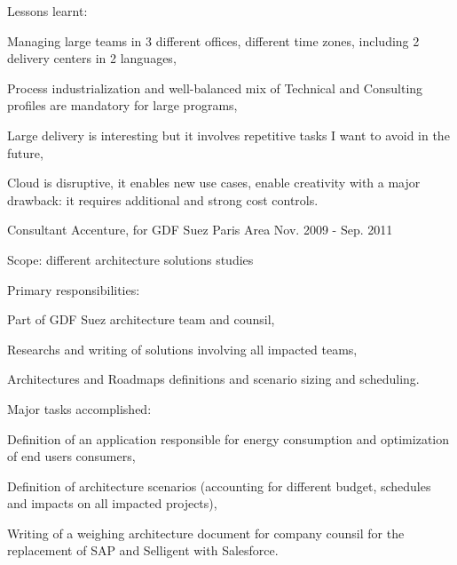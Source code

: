 \begin{cventries}
{\begin{cvitems}
\begin{cvsubitems}
        \end{cvsubitems}
        \item {Lessons learnt:}
        \begin{cvsubitems}
          \item {Managing large teams in 3 different offices, different time zones, including 2 delivery centers in 2 languages,}
          \item {Process industrialization and well-balanced mix of Technical and Consulting profiles are mandatory for large programs,}
          \item {Large delivery is interesting but it involves repetitive tasks I want to avoid in the future,}
          \item {Cloud is disruptive, it enables new use cases, enable creativity with a major drawback: it requires additional and strong cost controls.}
        \end{cvsubitems}
      \end{cvitems}
    }

  \cventry
    {Consultant} %
    {Accenture, for GDF Suez} %
    {Paris Area} %
    {Nov. 2009 - Sep. 2011} %
    {
      \begin{cvitems} %
        \item {Scope: different architecture solutions studies}
        \item {Primary responsibilities:}
        \begin{cvsubitems}
          \item {Part of GDF Suez architecture team and counsil,}
          \item {Researchs and writing of solutions involving all impacted teams,}
          \item {Architectures and Roadmaps definitions and scenario sizing and scheduling.}
        \end{cvsubitems}
        \item {Major tasks accomplished:}
        \begin{cvsubitems}
          \item {Definition of an application responsible for energy consumption and optimization of end users consumers,}
          \item {Definition of architecture scenarios (accounting for different budget, schedules and impacts on all impacted projects),}
          \item {Writing of a weighing architecture document for company counsil for the replacement of SAP and Selligent with Salesforce.}
        \end{cvsubitems}
      \end{cvitems}
    }


\end{cventries}
